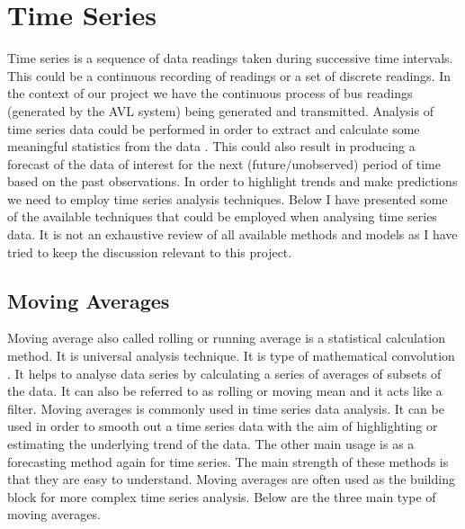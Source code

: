 \section{Time Series}
Time series is a sequence of data readings taken during successive time intervals. This could be a continuous recording of readings or a set of discrete readings. In the context of our project we have the continuous process of bus readings (generated by the AVL system) being generated and transmitted. Analysis of time series data could be performed in order to extract and calculate some meaningful statistics from the data \cite{shumway2010time}. This could also result in producing a forecast of the data of interest for the next (future/unobserved) period of time based on the past observations. In order to highlight trends and make predictions we need to employ time series analysis techniques. Below I have presented some of the available techniques that could be employed when analysing time series data. It is not an exhaustive review of all available methods and models as I have tried to keep the discussion relevant to this project.


\subsection{Moving Averages}
Moving average also called rolling or running average is a statistical calculation method. It is universal analysis technique. It is type of mathematical convolution \cite{shumway2010time}. It helps to analyse data series by calculating a series of averages of subsets of the data. It can also be referred to as rolling or moving mean and it acts like a filter. Moving averages is commonly used in time series data analysis. It can be used in order to smooth out  a time series data with the aim of highlighting or estimating the underlying trend of the data. The other main usage is as a forecasting method again for time series. The main strength of these methods is that they are easy to understand.  Moving averages are often used as the building block for more complex time series analysis. Below are the three main type of moving averages.


